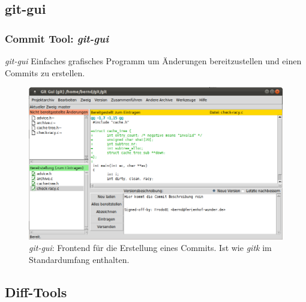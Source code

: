 \documentclass{beamer}
\begin{document}
\subsection{git-gui}
\begin{frame}\frametitle{Commit Tool: \textit{git-gui}}
\begin{block}{\textit{git-gui}}
Einfaches grafisches Programm um Änderungen bereitzustellen und einen Commits zu erstellen. 
\end{block}

\begin{figure}
\includegraphics[scale=1.1]{Bilder/git_gui} 
\caption{\textit{git-gui}: Frontend für die Erstellung eines Commits. Ist wie \textit{gitk} im Standardumfang enthalten.}
\end{figure}
\end{frame}

\subsection{Diff-Tools}
\end{document}
